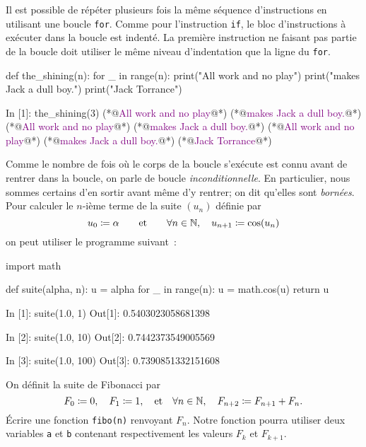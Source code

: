 \documentclass{magnoliaold}
\begin{document}
Il est possible de répéter plusieurs fois la même séquence d'instructions en utilisant une boucle \verb_for_.
Comme pour l'instruction \verb_if_, le bloc d'instructions à exécuter dans la boucle est indenté.
La première instruction ne faisant pas partie de la boucle doit utiliser le même niveau d'indentation que la ligne du \verb_for_. 

\begin{pythoncodeline}
def the_shining(n):
    for _ in range(n):
        print("All work and no play")
        print("makes Jack a dull boy.")
    print("Jack Torrance")
\end{pythoncodeline}

\begin{pythoncode}
In [1]: the_shining(3)
(*@\textcolor{purple}{All work and no play}@*)
(*@\textcolor{purple}{makes Jack a dull boy.}@*)
(*@\textcolor{purple}{All work and no play}@*)
(*@\textcolor{purple}{makes Jack a dull boy.}@*)
(*@\textcolor{purple}{All work and no play}@*)
(*@\textcolor{purple}{makes Jack a dull boy.}@*)
(*@\textcolor{purple}{Jack Torrance}@*)
\end{pythoncode}
\noindent
Comme le nombre de fois où le corps de la boucle s'exécute est connu avant de
rentrer dans la boucle, on parle de boucle \emph{inconditionnelle}. En particulier, nous
sommes certains d'en sortir avant même d'y rentrer; on dit qu'elles
sont \emph{bornées}.\\

Pour calculer le $n$-ième terme de la suite $(u_n)$ définie par
\[u_0 \coloneqq \alpha \qquad\text{et}\qquad \forall n\in\mathbb{N} ,\quad u_{n+1}\coloneqq \cos(u_n)\]
on peut utiliser le programme suivant~:

\begin{pythoncodeline}
import math

def suite(alpha, n):
    u = alpha
    for _ in range(n):
        u = math.cos(u)
    return u
\end{pythoncodeline}

\begin{pythoncode}
In [1]: suite(1.0, 1)
Out[1]: 0.5403023058681398

In [2]: suite(1.0, 10)
Out[2]: 0.7442373549005569

In [3]: suite(1.0, 100)
Out[3]: 0.7390851332151608
\end{pythoncode}


\begin{exoUnique}
\exo On définit la suite de Fibonacci par
\[F_0\coloneqq 0,\quad F_1\coloneqq 1,\quad \text{et}\quad \forall n\in\mathbb{N},\quad F_{n+2}\coloneqq F_{n+1}+F_n.\]
Écrire une fonction \verb!fibo(n)! renvoyant $F_n$. Notre fonction pourra utiliser deux
variables \verb_a_ et \verb_b_ contenant respectivement les valeurs $F_k$ et $F_{k+1}$.
\end{exoUnique}
\end{document}
